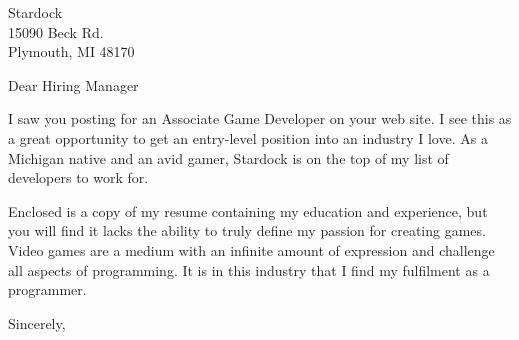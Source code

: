 \documentclass{letter}
\begin{document}
\begin{letter}{ Stardock \\ 15090 Beck Rd. \\ Plymouth, MI 48170 }

\opening{Dear Hiring Manager}

I saw you posting for an Associate Game Developer on your web site.  I see this as a great opportunity to get an entry-level position into an industry I love.  As a Michigan native and an avid gamer, Stardock is on the top of my list of developers to work for.

Enclosed is a copy of my resume containing my education and experience, but you will find it lacks the ability to truly define my passion for creating games.  Video games are a medium with an infinite amount of expression and challenge all aspects of programming.  It is in this industry that I find my fulfilment as a programmer.



\closing{Sincerely,}
\end{letter}
\end{document}
